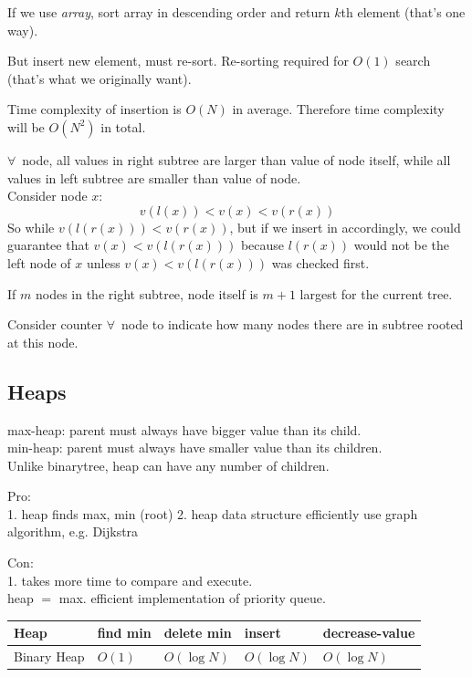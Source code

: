 \documentclass[10pt]{amsart}
\begin{document}
\begin{multicols*}{2}
If we use \emph{array}, sort array in descending order and return $k$th element (that's one way).  

But insert new element, must re-sort. Re-sorting required for $O(1)$ search (that's what we originally want).

Time complexity of insertion is $O(N)$ in average. Therefore time complexity will be $O(N^2)$ in total.

$\forall \, $ node, all values in right subtree are larger than value of node itself, while all values in left subtree are smaller than value of node. \\
Consider node $x$:
\[
v(l(x)) < v(x) < v(r(x))
\]
So while $v(l(r(x))) < v(r(x))$, but if we insert in accordingly, we could guarantee that $v(x) < v(l(r(x)))$ because $l(r(x))$ would not be the left node of $x$ unless $v(x) < v(l(r(x)))$ was checked first.

If $m$ nodes in the right subtree, node itself is $m+1$ largest for the current tree.

Consider counter $\forall \,$ node to indicate how many nodes there are in subtree rooted at this node.

\subsection{Heaps}

max-heap: parent must always have bigger value than its child. \\
min-heap: parent must always have smaller value than its children. \\
Unlike binarytree, heap can have any number of children. 

Pro: \\ 
1. heap finds max, min (root)
2. heap data structure efficiently use graph algorithm, e.g. Dijkstra

Con: \\
1. takes more time to compare and execute. \\
heap $ = $ max. efficient implementation of priority queue. 

\begin{center}
	\begin{tabular}{ l | l | l | l | l  }
		\hline
		Heap & find min & delete min & insert & decrease-value \\ \hline
		Binary Heap & $O(1)$ & $O(\log{N})$ & $O(\log{N})$ & $O(\log{N})$ \\ \hline 
		\hline
	\end{tabular}
\end{center}


\end{multicols*}
\end{document}
